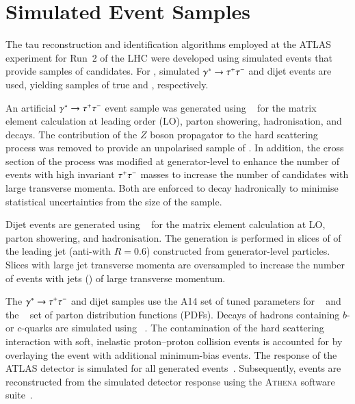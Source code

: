 \section{Simulated Event Samples}%
\label{sec:tauid_mc}

The tau reconstruction and identification algorithms employed at the ATLAS
experiment for Run~2 of the LHC were developed using simulated events that
provide samples of \tauhadvis candidates. For \tauid, simulated
$\gamma^{*} \to \tau^{+} \tau^{-}$ and dijet events are used, yielding samples of true
and \faketauhadvis, respectively.

An artificial $\gamma^{*} \to \tau^{+} \tau^{-}$ event sample was generated
using \PYTHIA[8.212]~\cite{Sjostrand:2014zea} for the matrix element
calculation at leading order (LO), parton showering, hadronisation,
and \tauleptonC decays. The contribution of the $Z$ boson propagator to
the hard scattering process was removed to provide an unpolarised
sample of \tauleptons. In addition, the cross section of the process
was modified at generator-level to enhance the number of events with
high invariant $\tau^{+} \tau^{-}$ masses to increase the number of \tauhadvis
candidates with large transverse momenta. Both \tauleptons
are enforced to decay hadronically to minimise statistical
uncertainties from the size of the \truetauhadvisC sample.

Dijet events are generated using \PYTHIA[8.186]~\cite{Sjostrand:2014zea} for the
matrix element calculation at LO, parton showering, and hadronisation. The
generation is performed in slices of \pT of the leading jet (anti-\kt with
$R = 0.6$) constructed from generator-level particles. Slices with large jet
transverse momenta are oversampled to increase the number of events with jets
(\faketauhadvis) of large transverse momentum.

The $\gamma^{*} \to \tau^{+} \tau^{-}$ and dijet samples use the A14 set of tuned
parameters for \PYTHIA[8]~\cite{ATL-PHYS-PUB-2014-021} and the
\NNPDF[2.3lo]~\cite{Ball:2012cx} set of parton distribution functions (PDFs).
Decays of hadrons containing $b$- or $c$-quarks are simulated using
\EVTGEN[v1.2.0]~\cite{Lange:2001uf}. The contamination of the hard scattering
interaction with soft, inelastic proton--proton collision events is accounted
for by overlaying the event with additional minimum-bias events. The response of
the ATLAS detector is simulated for all generated
events~\cite{SOFT-2010-01}. Subsequently, events are reconstructed from the
simulated detector response using the \textsc{Athena} software
suite~\cite{ATL-SOFT-PUB-2021-001}.


